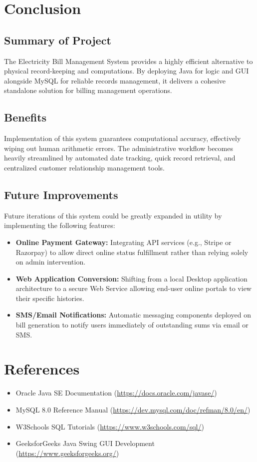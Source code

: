 \documentclass[a4paper,12pt]{article}
\begin{document}
\section{Conclusion}

\subsection{Summary of Project}
The Electricity Bill Management System provides a highly efficient alternative to physical record-keeping and computations. By deploying Java for logic and GUI alongside MySQL for reliable records management, it delivers a cohesive standalone solution for billing management operations.

\subsection{Benefits}
Implementation of this system guarantees computational accuracy, effectively wiping out human arithmetic errors. The administrative workflow becomes heavily streamlined by automated date tracking, quick record retrieval, and centralized customer relationship management tools.

\subsection{Future Improvements}
Future iterations of this system could be greatly expanded in utility by implementing the following features:
\begin{itemize}
    \item \textbf{Online Payment Gateway:} Integrating API services (e.g., Stripe or Razorpay) to allow direct online status fulfillment rather than relying solely on admin intervention.
    \item \textbf{Web Application Conversion:} Shifting from a local Desktop application architecture to a secure Web Service allowing end-user online portals to view their specific histories.
    \item \textbf{SMS/Email Notifications:} Automatic messaging components deployed on bill generation to notify users immediately of outstanding sums via email or SMS.
\end{itemize}


\section*{References}

\begin{itemize}
    \item Oracle Java SE Documentation (\url{https://docs.oracle.com/javase/})
    \item MySQL 8.0 Reference Manual (\url{https://dev.mysql.com/doc/refman/8.0/en/})
    \item W3Schools SQL Tutorials (\url{https://www.w3schools.com/sql/})
    \item GeeksforGeeks Java Swing GUI Development (\url{https://www.geeksforgeeks.org/})
\end{itemize}
\end{document}
